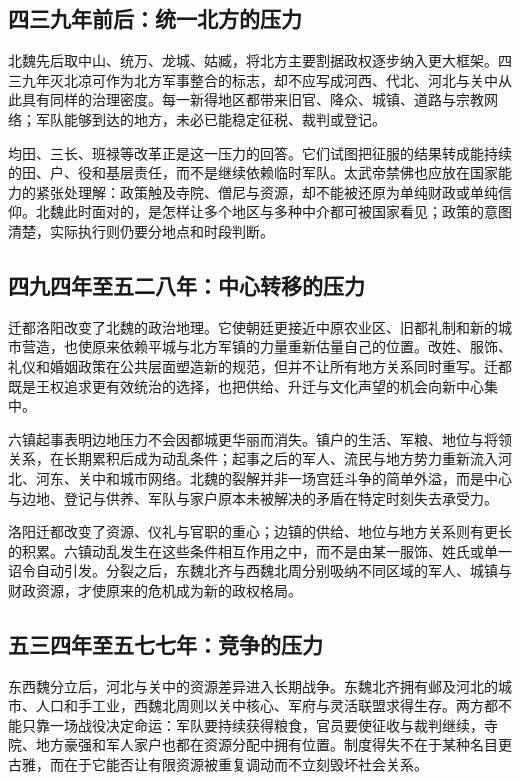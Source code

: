 \subsection{四三九年前后：统一北方的压力}

北魏先后取中山、统万、龙城、姑臧，将北方主要割据政权逐步纳入更大框架。四三九年灭北凉可作为北方军事整合的标志，却不应写成河西、代北、河北与关中从此具有同样的治理密度。每一新得地区都带来旧官、降众、城镇、道路与宗教网络；军队能够到达的地方，未必已能稳定征税、裁判或登记。

均田、三长、班禄等改革正是这一压力的回答。它们试图把征服的结果转成能持续的田、户、役和基层责任，而不是继续依赖临时军队。太武帝禁佛也应放在国家能力的紧张处理解：政策触及寺院、僧尼与资源，却不能被还原为单纯财政或单纯信仰。北魏此时面对的，是怎样让多个地区与多种中介都可被国家看见；政策的意图清楚，实际执行则仍要分地点和时段判断。

\subsection{四九四年至五二八年：中心转移的压力}

迁都洛阳改变了北魏的政治地理。它使朝廷更接近中原农业区、旧都礼制和新的城市营造，也使原来依赖平城与北方军镇的力量重新估量自己的位置。改姓、服饰、礼仪和婚姻政策在公共层面塑造新的规范，但并不让所有地方关系同时重写。迁都既是王权追求更有效统治的选择，也把供给、升迁与文化声望的机会向新中心集中。

六镇起事表明边地压力不会因都城更华丽而消失。镇户的生活、军粮、地位与将领关系，在长期累积后成为动乱条件；起事之后的军人、流民与地方势力重新流入河北、河东、关中和城市网络。北魏的裂解并非一场宫廷斗争的简单外溢，而是中心与边地、登记与供养、军队与家户原本未被解决的矛盾在特定时刻失去承受力。

\begin{causalchain}
洛阳迁都改变了资源、仪礼与官职的重心；边镇的供给、地位与地方关系则有更长的积累。六镇动乱发生在这些条件相互作用之中，而不是由某一服饰、姓氏或单一诏令自动引发。分裂之后，东魏北齐与西魏北周分别吸纳不同区域的军人、城镇与财政资源，才使原来的危机成为新的政权格局。
\end{causalchain}

\subsection{五三四年至五七七年：竞争的压力}

东西魏分立后，河北与关中的资源差异进入长期战争。东魏北齐拥有邺及河北的城市、人口和手工业，西魏北周则以关中核心、军府与灵活联盟求得生存。两方都不能只靠一场战役决定命运：军队要持续获得粮食，官员要使征收与裁判继续，寺院、地方豪强和军人家户也都在资源分配中拥有位置。制度得失不在于某种名目更古雅，而在于它能否让有限资源被重复调动而不立刻毁坏社会关系。

